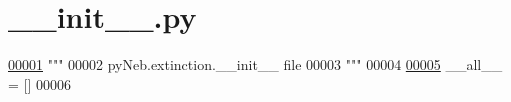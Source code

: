 \hypertarget{extinction_2____init_____8py_source}{}\section{\+\_\+\+\_\+init\+\_\+\+\_\+.\+py}
\label{extinction_2____init_____8py_source}

\begin{DoxyCode}
\hypertarget{extinction_2____init_____8py_source_l00001}{}\hyperlink{namespacepyneb_1_1extinction}{00001} \textcolor{stringliteral}{"""}
00002 \textcolor{stringliteral}{pyNeb.extinction.\_\_init\_\_ file}
00003 \textcolor{stringliteral}{"""}
00004 
\hypertarget{extinction_2____init_____8py_source_l00005}{}\hyperlink{namespacepyneb_1_1extinction_ac47e2b9084a5ecfc36e3f0fad7ba3b5d}{00005} \_\_all\_\_ = []
00006 
\end{DoxyCode}
